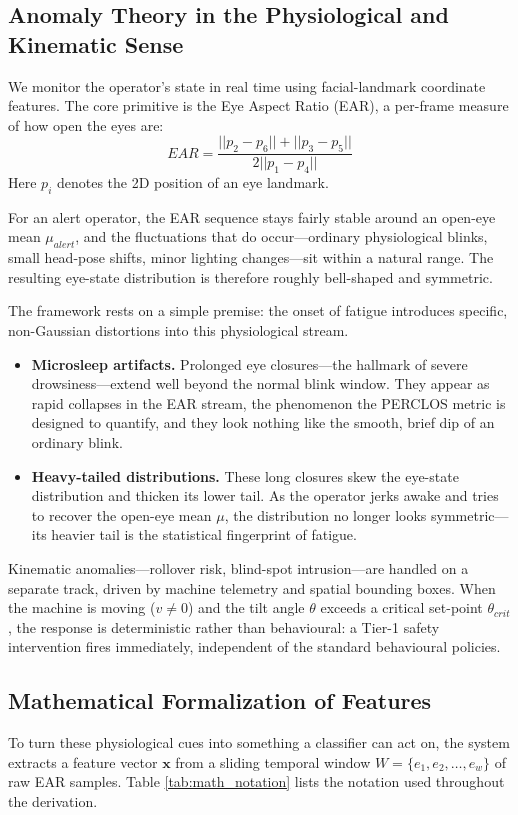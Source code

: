 \subsection{Anomaly Theory in the Physiological and Kinematic Sense}
We monitor the operator's state in real time using facial-landmark coordinate features. The core primitive is the Eye Aspect Ratio (EAR), a per-frame measure of how open the eyes are:
\begin{equation}
    EAR = \frac{||p_2 - p_6|| + ||p_3 - p_5||}{2 ||p_1 - p_4||} \label{eq:ear}
\end{equation}
Here $p_i$ denotes the 2D position of an eye landmark.

For an alert operator, the EAR sequence stays fairly stable around an open-eye mean $\mu_{alert}$, and the fluctuations that do occur---ordinary physiological blinks, small head-pose shifts, minor lighting changes---sit within a natural range. The resulting eye-state distribution is therefore roughly bell-shaped and symmetric.

The framework rests on a simple premise: the onset of fatigue introduces specific, non-Gaussian distortions into this physiological stream.

\begin{itemize}
    \item \textbf{Microsleep artifacts.} Prolonged eye closures---the hallmark of severe drowsiness---extend well beyond the normal blink window. They appear as rapid collapses in the EAR stream, the phenomenon the PERCLOS metric is designed to quantify, and they look nothing like the smooth, brief dip of an ordinary blink.
    \item \textbf{Heavy-tailed distributions.} These long closures skew the eye-state distribution and thicken its lower tail. As the operator jerks awake and tries to recover the open-eye mean $\mu$, the distribution no longer looks symmetric---its heavier tail is the statistical fingerprint of fatigue.
\end{itemize}

Kinematic anomalies---rollover risk, blind-spot intrusion---are handled on a separate track, driven by machine telemetry and spatial bounding boxes. When the machine is moving ($v \neq 0$) and the tilt angle $\theta$ exceeds a critical set-point $\theta_{crit}$, the response is deterministic rather than behavioural: a Tier-1 safety intervention fires immediately, independent of the standard behavioural policies.

\subsection{Mathematical Formalization of Features}
To turn these physiological cues into something a classifier can act on, the system extracts a feature vector $\mathbf{x}$ from a sliding temporal window $W = \{e_1, e_2, \dots, e_w\}$ of raw EAR samples. Table \ref{tab:math_notation} lists the notation used throughout the derivation.

